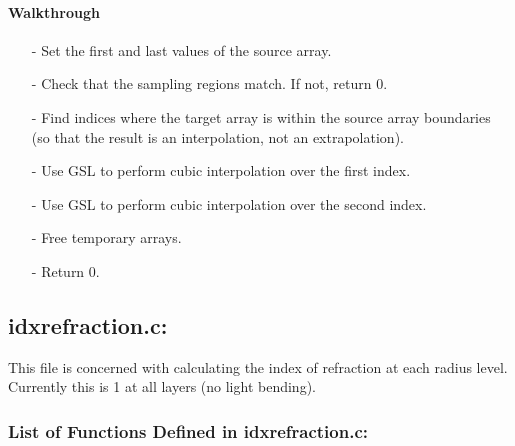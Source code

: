\documentclass[letterpaper,12pt]{article}
\begin{document}
\paragraph{Walkthrough}
\begin{enumerate}[leftmargin=10pt, noitemsep, parsep=0pt, topsep=0ex]
\item[-] Set the first and last values of the source array.
\item[-] Check that the sampling regions match. If not, return 0.
\item[-] Find indices where the target array is within the source array boundaries (so that the result is an interpolation, not an extrapolation).
\item[-] Use GSL to perform cubic interpolation over the first index.
\item[-] Use GSL to perform cubic interpolation over the second index.
\item[-] Free temporary arrays.
\item[-] Return 0.
\end{enumerate}

\newpage
\subsection{idxrefraction.c:}
This file is concerned with calculating the index of refraction at each radius level. Currently this is 1 at all layers (no light bending).
\subsubsection{List of Functions Defined in idxrefraction.c:}
 \newline

 \newline

 \newline

 \newline
\end{document}
